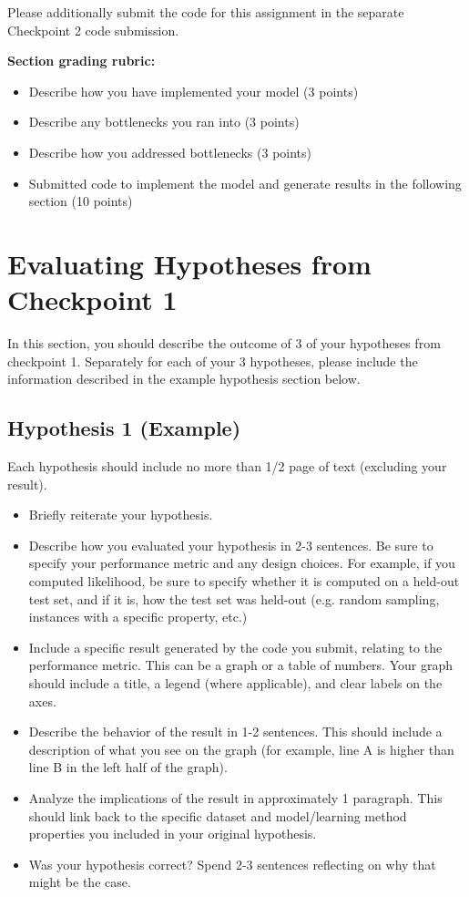 \documentclass[12pt]{article}
\begin{document}
Please additionally submit the code for this assignment in the separate Checkpoint 2 code submission.

\textbf{Section grading rubric:}
\begin{itemize}
	\item Describe how you have implemented your model (3 points)
	\item Describe any bottlenecks you ran into (3 points)
	\item Describe how you addressed bottlenecks (3 points)
	\item Submitted code to implement the model and generate results in the following section (10 points)
\end{itemize}

\section{Evaluating Hypotheses from Checkpoint 1}

In this section, you should describe the outcome of 3 of your hypotheses from checkpoint 1.  Separately for each of your 3 hypotheses, please include the information described in the example hypothesis section below.

\subsection{Hypothesis 1 (Example)}

Each hypothesis should include no more than 1/2 page of text (excluding your result).  

\begin{itemize}
 \item Briefly reiterate your hypothesis.  
 \item Describe how you evaluated your hypothesis in 2-3 sentences.  Be sure to specify your performance metric and any design choices.  For example, if you computed likelihood, be sure to specify whether it is computed on a held-out test set, and if it is, how the test set was held-out (e.g. random sampling, instances with a specific property, etc.)
 \item Include a specific result generated by the code you submit, relating to the performance metric.  This can be a graph or a table of numbers.  Your graph should include a title, a legend (where applicable), and clear labels on the axes.   
 \item Describe the behavior of the result in 1-2 sentences.  This should include a description of what you see on the graph (for example, line A is higher than line B in the left half of the graph).
 \item Analyze the implications of the result in approximately 1 paragraph.  This should link back to the specific dataset and model/learning method properties you included in your original hypothesis.  
 \item Was your hypothesis correct?  Spend 2-3 sentences reflecting on why that might be the case.
\end{itemize}
\end{document}
